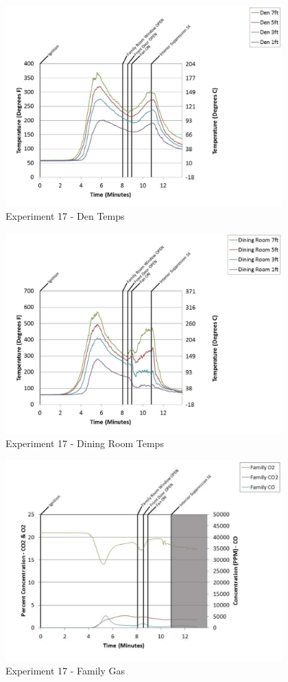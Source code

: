 \documentclass{article}
\begin{document}
\begin{appendices}
	\begin{figure}[h!]
		\centering
		\includegraphics[height=3.05in]{0_Images/Results_Charts/Exp_17_Charts/DenTemps.pdf}
		\caption{Experiment 17 - Den Temps}
	\end{figure}
 
	\clearpage

	\begin{figure}[h!]
		\centering
		\includegraphics[height=3.05in]{0_Images/Results_Charts/Exp_17_Charts/DiningRoomTemps.pdf}
		\caption{Experiment 17 - Dining Room Temps}
	\end{figure}
 

	\begin{figure}[h!]
		\centering
		\includegraphics[height=3.05in]{0_Images/Results_Charts/Exp_17_Charts/FamilyGas.pdf}
		\caption{Experiment 17 - Family Gas}
	\end{figure}
 

\end{appendices}
\end{document}
